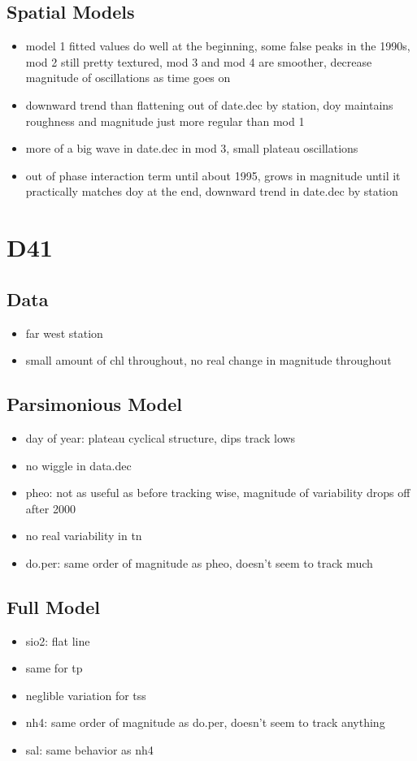 \documentclass[12pt]{amsart}
\begin{document}
\subsection{Spatial Models}

\begin{itemize}
\item model 1 fitted values do well at the beginning, some false peaks in the 1990s, mod 2 still pretty textured, mod 3 and mod 4 are smoother, decrease magnitude of oscillations as time goes on
\item downward trend than flattening out of date.dec by station, doy maintains roughness and magnitude just more regular than mod 1
\item more of a big wave in date.dec in mod 3, small plateau oscillations
\item out of phase interaction term until about 1995, grows in magnitude until it practically matches doy at the end, downward trend in date.dec by station
\end{itemize}


\section{D41}
\subsection{Data}
\begin{itemize}
\item far west station
\item small amount of chl throughout, no real change in magnitude throughout

\end{itemize}
\subsection{Parsimonious Model}
\begin{itemize}
\item day of year: plateau cyclical structure, dips track lows
\item no wiggle in data.dec
\item pheo: not as useful as before tracking wise, magnitude of variability drops off after 2000
\item no real variability in tn
\item do.per: same order of magnitude as pheo, doesn't seem to track much
\end{itemize}
\subsection{Full Model}
\begin{itemize}
\item sio2: flat line
\item same for tp
\item neglible variation for tss
\item nh4: same order of magnitude as do.per, doesn't seem to track anything
\item sal: same behavior as nh4
\end{itemize}
\end{document}
